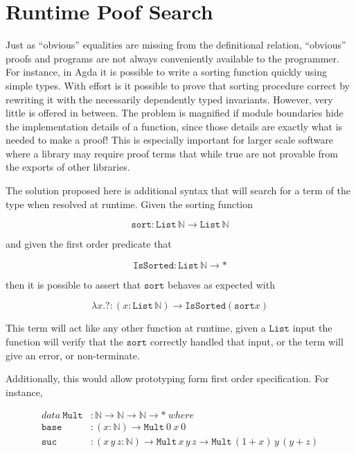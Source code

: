 \section{Runtime Poof Search}

Just as ``obvious'' equalities are missing from the definitional relation, ``obvious'' proofs and programs are not always conveniently available to the programmer.
For instance, in Agda it is possible to write a sorting function quickly using simple types.
With effort is it possible to prove that sorting procedure correct by rewriting it with the necessarily dependently typed invariants.
However, very little is offered in between.
The problem is magnified if module boundaries hide the implementation details of a function, since those details are exactly what is needed to make a proof!
This is especially important for larger scale software where a library may require proof terms that while true are not provable from the exports of other libraries.

The solution proposed here is additional syntax that will search for a term of the type when resolved at runtime.
Given the sorting function 

\[
\mathtt{sort}:\mathtt{List}\,\mathbb{N}\rightarrow\mathtt{List}\,\mathbb{N}
\]

and given the first order predicate that 

\[
\mathtt{IsSorted}:\mathtt{List}\,\mathbb{N}\rightarrow*
\]

then it is possible to assert that $\mathtt{sort}$ behaves as expected with

\[
\lambda x.?:\left(x:\mathtt{List}\,\mathbb{N}\right)\rightarrow\mathtt{IsSorted}\left(\mathtt{sort}x\right)
\]

This term will act like any other function at runtime, given a $\mathtt{List}$ input the function will verify that the $\mathtt{sort}$ correctly handled that input, or the term will give an error, or non-terminate.

Additionally, this would allow prototyping form first order specification.
For instance,

\begin{align*}
data\ \mathtt{Mult} & :\mathbb{N}\rightarrow\mathbb{N}\rightarrow\mathbb{N}\rightarrow*\ where\\
\mathtt{base} & :\left(x:\mathbb{N}\right)\rightarrow\mathtt{Mult}\ 0\ x\ 0\\
\mathtt{suc} & :\left(x\,y\,z:\mathbb{N}\right)\rightarrow\mathtt{Mult}\,x\,y\,z\rightarrow\mathtt{Mult}\,\left(1+x\right)\,y\,(y+z)
\end{align*}

